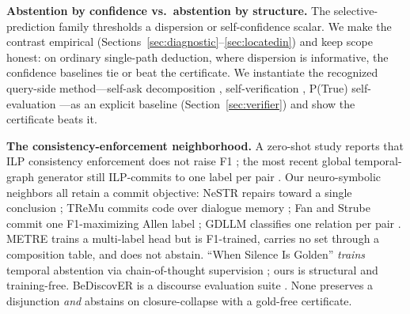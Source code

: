 \documentclass[11pt,letterpaper]{article}
\begin{document}
\textbf{Abstention by confidence vs.\ abstention by structure.} The selective-prediction family \citep{Geifman2017, Lin2022, Tian2023, Wang2022, Kadavath2022, Kuhn2023, Farquhar2024, Manakul2023} thresholds a dispersion or self-confidence scalar. We make the contrast empirical (Sections~\ref{sec:diagnostic}--\ref{sec:locatedin}) and keep scope honest: on ordinary single-path deduction, where dispersion is informative, the confidence baselines tie or beat the certificate. We instantiate the recognized query-side method---self-ask decomposition \citep{Press2022}, self-verification \citep{Weng2022}, P(True) self-evaluation \citep{Kadavath2022}---as an explicit baseline (Section~\ref{sec:verifier}) and show the certificate beats it.

\textbf{The consistency-enforcement neighborhood.} A zero-shot study reports that ILP consistency enforcement does not raise F1 \citep{Kougia2024}; the most recent global temporal-graph generator still ILP-commits to one label per pair \citep{Eirew2025}. Our neuro-symbolic neighbors all retain a commit objective: NeSTR repairs toward a single conclusion \citep{Liang2025}; TReMu commits code over dialogue memory \citep{Ge2025}; Fan and Strube commit one F1-maximizing Allen label \citep{Fan2025}; GDLLM classifies one relation per pair \citep{Zhao2025}. METRE trains a multi-label head \citep{Hu2024} but is F1-trained, carries no set through a composition table, and does not abstain. ``When Silence Is Golden'' \emph{trains} temporal abstention via chain-of-thought supervision \citep{Zhou2026}; ours is structural and training-free. BeDiscovER is a discourse evaluation suite \citep{Li2025}. None preserves a disjunction \emph{and} abstains on closure-collapse with a gold-free certificate.
\end{document}
